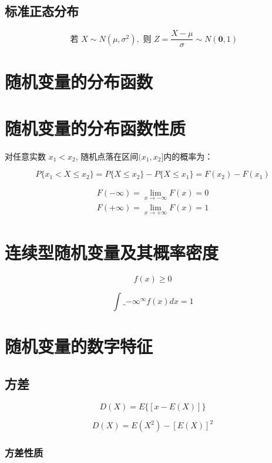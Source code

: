 \subsection{标准正态分布}

$$
\text { 若 } X \sim N\left(\mu, \sigma^{2}\right), \text { 则 } Z=\frac{X-\mu}{\sigma} \sim N(\mathbf{0}, 1)
$$

\section{随机变量的分布函数}

\section{随机变量的分布函数性质}

对任意实数 $x_1<x_2$, 随机点落在区间$( x_1 ,  x_2 ]$内的概率为：

$$
P\{ x_1<X  \le  x_2\} =P\{ X  \le   x_2 \} - P\{ X  \le   x_1 \}= F(x_2)-F(x_1)
$$

$$
\begin{array}{l}
F(-\infty)=\lim_{x \rightarrow-\infty} F(x)=0 \\
F(+\infty)=\lim_{x \rightarrow+\infty} F(x)=1
\end{array}
$$

\section{连续型随机变量及其概率密度}

$$ f(x) \geq 0 $$

$$ \int\_{-\infty}^{\infty} f(x) d x=1 $$


\section{随机变量的数字特征}

\subsection{方差}


$$
 D(X) = E \Big\{ [x-E(X)] \Big\}
$$

$$
 D(X) = E(X^2) - [E(X)] ^2
$$

\subsubsection{方差性质}

